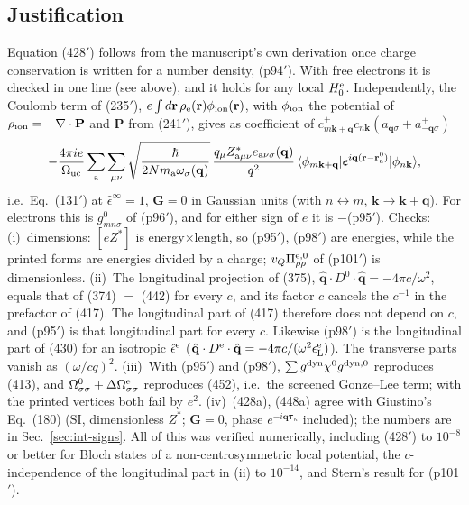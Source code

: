 \documentclass[11pt]{article}
\begin{document}
\subsection{Justification}
Equation (428$'$) follows from the manuscript's own derivation once charge conservation is written for a
number density, (p94$'$). With free electrons it is checked in one line (see above), and it holds for any
local $H^{\rm e}_0$. Independently, the Coulomb term of (235$'$), $e\int d\mathbf r\,\rho_{\rm e}(\mathbf r)
\phi_{\rm ion}(\mathbf r)$, with $\phi_{\rm ion}$ the potential of $\rho_{\rm ion}=-\nabla\cdot\mathbf P$ and
$\mathbf P$ from (241$'$), gives as coefficient of $c^+_{m\mathbf k+\mathbf q}c_{n\mathbf k}
(a_{\mathbf q\sigma}+a^+_{-\mathbf q\sigma})$
\begin{equation*}
-\frac{4\pi ie}{\Omega_{\rm uc}}\sum_{\rm a}\sum_{\mu\nu}\sqrt{\frac{\hbar}{2Nm_{\rm a}\omega_\sigma(\mathbf q)}}\,
\frac{q_\mu Z^*_{{\rm a}\mu\nu}e_{{\rm a}\nu\sigma}(\mathbf q)}{q^2}\,
\langle\phi_{m\mathbf k+\mathbf q}|e^{i\mathbf q(\mathbf r-\mathbf r^0_{\rm a})}|\phi_{n\mathbf k}\rangle ,
\end{equation*}
i.e.\ Eq.~(131$'$) at $\hat\epsilon^\infty=1$, $\mathbf G=0$ in Gaussian units (with $n\leftrightarrow m$,
$\mathbf k\to\mathbf k+\mathbf q$). For electrons this is $g^0_{m n\sigma}$ of (p96$'$), and for either sign of
$e$ it is $-$(p95$'$). Checks: (i)~dimensions: $[eZ^*]$ is energy$\times$length, so (p95$'$), (p98$'$) are
energies, while the printed forms are energies divided by a charge; $v_Q\Pi^{\rm e,0}_{\rho\rho}$ of
(p101$'$) is dimensionless. (ii)~The longitudinal projection of (375),
$\hat{\mathbf q}\cdot D^0\cdot\hat{\mathbf q}=-4\pi c/\omega^2$, equals that of (374) $=$ (442) for every $c$,
and its factor $c$ cancels the $c^{-1}$ in the prefactor of (417). The longitudinal part of (417)
therefore does not depend on $c$, and (p95$'$) is that longitudinal part for every $c$. Likewise (p98$'$)
is the longitudinal part of (430) for an isotropic $\hat\epsilon^{\rm e}$
($\hat{\mathbf q}\cdot D^{\rm e}\cdot\hat{\mathbf q}=-4\pi c/(\omega^2\epsilon^{\rm e}_{\rm L})$). The transverse
parts vanish as $(\omega/cq)^2$. (iii)~With (p95$'$) and (p98$'$), $\sum g^{\rm dyn}\chi^0g^{\rm dyn,0}$
reproduces (413), and $\Omega^0_{\sigma\sigma}+\Delta\Omega^{\rm e}_{\sigma\sigma}$ reproduces (452), i.e.\ the
screened Gonze--Lee term; with the printed vertices both fail by $e^2$. (iv)~(428a), (448a) agree with
Giustino's Eq.~(180) (SI, dimensionless $Z^*$; $\mathbf G=0$, phase $e^{-i\mathbf q\bm{\tau}_\kappa}$
included); the numbers are in Sec.~\ref{sec:int-signs}. All of this was verified numerically, including
(428$'$) to $10^{-8}$ or better for Bloch states of a non-centrosymmetric local potential, the
$c$-independence of the longitudinal part in (ii) to $10^{-14}$, and Stern's result for (p101$'$).
\end{document}
